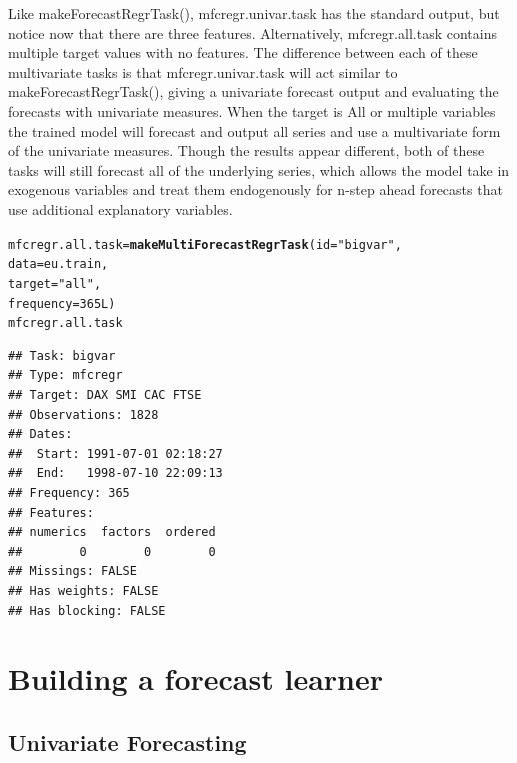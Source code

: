 \documentclass[12pt]{article}\usepackage[]{graphicx}\usepackage[]{color}
\makeatletter
\newcommand{\hlnum}[1]{\textcolor[rgb]{0.686,0.059,0.569}{#1}}%
\newcommand{\hlstr}[1]{\textcolor[rgb]{0.192,0.494,0.8}{#1}}%
\newcommand{\hlstd}[1]{\textcolor[rgb]{0.345,0.345,0.345}{#1}}%
\newcommand{\hlkwb}[1]{\textcolor[rgb]{0.69,0.353,0.396}{#1}}%
\newcommand{\hlkwc}[1]{\textcolor[rgb]{0.333,0.667,0.333}{#1}}%
\newcommand{\hlkwd}[1]{\textcolor[rgb]{0.737,0.353,0.396}{\textbf{#1}}}%
\newenvironment{kframe}{%
 \def\at@end@of@kframe{}%
 \ifinner\ifhmode%
  \def\at@end@of@kframe{\end{minipage}}%
  \begin{minipage}{\columnwidth}%
 \fi\fi%
 \def\FrameCommand##1{\hskip\@totalleftmargin \hskip-\fboxsep
 \colorbox{shadecolor}{##1}\hskip-\fboxsep
     \hskip-\linewidth \hskip-\@totalleftmargin \hskip\columnwidth}%
 \MakeFramed {\advance\hsize-\width
   \@totalleftmargin\z@ \linewidth\hsize
   \@setminipage}}%
 {\par\unskip\endMakeFramed%
 \at@end@of@kframe}
\newenvironment{knitrout}{}{} %
\theoremstyle{definition}
\newcommand\code{\@codex}
\def\@codex#1{{\normalfont\ttfamily\hyphenchar\font=-1 #1}}
\makeatother
\begin{document}
Like \code{makeForecastRegrTask()}, \code{mfcregr.univar.task} has the standard output, but notice now that there are three features. Alternatively, \code{mfcregr.all.task} contains multiple target values with no features. The difference between each of these multivariate tasks is that \code{mfcregr.univar.task} will act similar to \code{makeForecastRegrTask()}, giving a univariate forecast output and evaluating the forecasts with univariate measures. When the target is \code{All} or multiple variables the trained model will forecast and output all series and use a multivariate form of the univariate measures. Though the results appear different, both of these tasks will still forecast all of the underlying series, which allows the model take in exogenous variables and treat them endogenously for n-step ahead forecasts that use additional explanatory variables.

\singlespacing
\begin{knitrout}
\color{fgcolor}\begin{kframe}
\begin{alltt}
\hlstd{mfcregr.all.task} \hlkwb{=} \hlkwd{makeMultiForecastRegrTask}\hlstd{(}\hlkwc{id} \hlstd{=} \hlstr{"bigvar"}\hlstd{,}
                                      \hlkwc{data} \hlstd{= eu.train,}
                                      \hlkwc{target} \hlstd{=} \hlstr{"all"}\hlstd{,}
                                      \hlkwc{frequency} \hlstd{=} \hlnum{365L}\hlstd{)}
\hlstd{mfcregr.all.task}
\end{alltt}
\begin{verbatim}
## Task: bigvar
## Type: mfcregr
## Target: DAX SMI CAC FTSE
## Observations: 1828
## Dates:
##  Start: 1991-07-01 02:18:27 
##  End:   1998-07-10 22:09:13
## Frequency: 365
## Features:
## numerics  factors  ordered 
##        0        0        0 
## Missings: FALSE
## Has weights: FALSE
## Has blocking: FALSE
\end{verbatim}
\end{kframe}
\end{knitrout}
\doublespacing

\section{Building a forecast learner}
\label{seq:build}
\subsection{Univariate Forecasting}
\label{seq:buildAndTuneUni}
\end{document}
